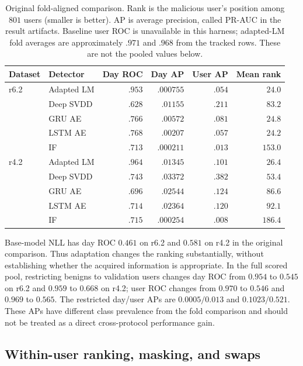 \begin{table}[htbp]
\centering\small
\begin{tabular}{llrrrr}
\toprule
Dataset & Detector & Day ROC & Day AP & User AP & Mean rank \\
\midrule
r6.2 & Adapted LM & $.953$ & $.000755$ & $.054$ & $24.0$ \\
 & Deep SVDD & $.628$ & $.01155$ & $.211$ & $83.2$ \\
 & GRU AE & $.766$ & $.00572$ & $.081$ & $24.8$ \\
 & LSTM AE & $.768$ & $.00207$ & $.057$ & $24.2$ \\
 & IF & $.713$ & $.000211$ & $.013$ & $153.0$ \\
\midrule
r4.2 & Adapted LM & $.964$ & $.01345$ & $.101$ & $26.4$ \\
 & Deep SVDD & $.743$ & $.03372$ & $.382$ & $53.4$ \\
 & GRU AE & $.696$ & $.02544$ & $.124$ & $86.6$ \\
 & LSTM AE & $.714$ & $.02364$ & $.120$ & $92.1$ \\
 & IF & $.715$ & $.000254$ & $.008$ & $186.4$ \\
\bottomrule
\end{tabular}
\caption{Original fold-aligned comparison. Rank is the malicious user's
position among $801$ users (smaller is better). AP is average precision,
called PR-AUC in the result artifacts. Baseline user ROC is unavailable
in this harness; adapted-LM fold averages are approximately $.971$ and
$.968$ from the tracked rows. These are not the pooled values below.}
\label{tab:readable_detectors}
\end{table}

Base-model NLL has day ROC $0.461$ on r6.2 and $0.581$ on r4.2 in
the original comparison. Thus adaptation changes the ranking substantially,
without establishing whether the acquired information is appropriate.
In the full scored pool, restricting benigns to validation users changes
day ROC from $0.954$ to $0.545$ on r6.2 and $0.959$ to $0.668$ on
r4.2; user ROC changes from $0.970$ to $0.546$ and $0.969$ to $0.565$.
The restricted day/user APs are $0.0005/0.013$ and $0.1023/0.521$.
These APs have different class prevalence from the fold comparison and
should not be treated as a direct cross-protocol performance gain.

\subsection{Within-user ranking, masking, and swaps}

